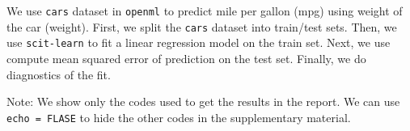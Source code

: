 \documentclass[
  11pt,
  letterpaper,
  DIV=11,
  numbers=noendperiod]{scrartcl}
\begin{document}
We use \texttt{cars} dataset in \texttt{openml} to predict mile per
gallon (mpg) using weight of the car (weight). First, we split the
\texttt{cars} dataset into train/test sets. Then, we use
\texttt{scit-learn} to fit a linear regression model on the train set.
Next, we use compute mean squared error of prediction on the test set.
Finally, we do diagnostics of the fit.

Note: We show only the codes used to get the results in the report. We
can use \texttt{echo\ =\ FLASE} to hide the other codes in the
supplementary material.
\end{document}
